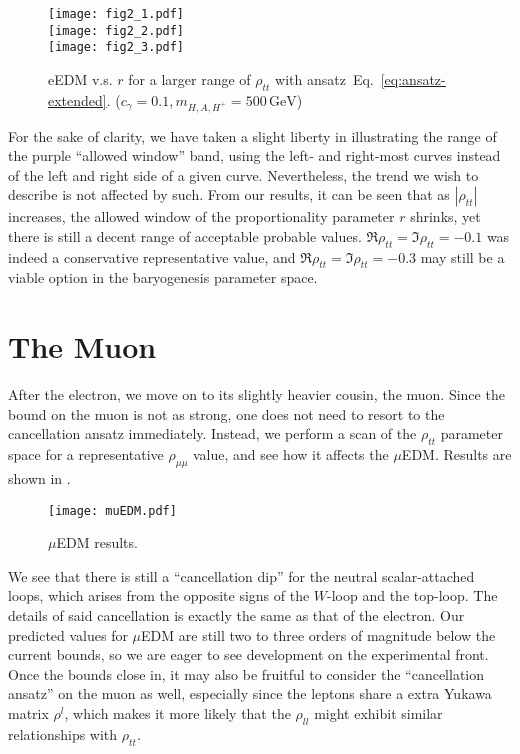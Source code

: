 \begin{figure}[p]
    \centering
    \texttt{[image: fig2\_1.pdf]}\\
    \texttt{[image: fig2\_2.pdf]}\\
    \texttt{[image: fig2\_3.pdf]}
    \caption{eEDM v.s. \(r \) for a larger range of \(\rho_{tt} \) with ansatz~Eq.~\eqref{eq:ansatz-extended}. (\(c_{\gamma} = 0.1, m_{H, A, H^+} = 500\,\mathrm{GeV} \))}
    \label{fig:eEDM}
\end{figure}

For the sake of clarity, we have taken a slight liberty in illustrating the range of the purple ``allowed window'' band,
using the left- and right-most curves instead of the left and right side of a given curve.
Nevertheless, the trend we wish to describe is not affected by such.
From our results, it can be seen that as \(|\rho_{tt}| \) increases, the allowed window of the proportionality parameter \(r \) shrinks, yet there is still a decent range of acceptable probable values.
\(\Re\rho_{tt} = \Im\rho_{tt} = -0.1 \) was indeed a conservative representative value, and \(\Re\rho_{tt} = \Im\rho_{tt} = -0.3 \) may still be a viable option in the baryogenesis parameter space.

\section{The Muon}
After the electron, we move on to its slightly heavier cousin, the muon. 
Since the bound on the muon is not as strong, one does not need to resort to the cancellation ansatz immediately.
Instead, we perform a scan of the \(\rho_{tt} \) parameter space for a representative \(\rho_{\mu\mu} \) value, and see how it affects the \(\mu \)EDM.
Results are shown in .

\begin{figure}[p]
    \centering
    \texttt{[image: muEDM.pdf]}
    \caption{\(\mu \)EDM results.}
    \label{fig:muEDM}
\end{figure}

We see that there is still a ``cancellation dip'' for the neutral scalar-attached loops, which arises from the opposite signs of the \(W \)-loop and the top-loop.
The details of said cancellation is exactly the same as that of the electron.
Our predicted values for \(\mu \)EDM are still two to three orders of magnitude below the current bounds, so we are eager to see development on the experimental front.
Once the bounds close in, it may also be fruitful to consider the ``cancellation ansatz'' on the muon as well, especially since the leptons share a extra Yukawa matrix \(\rho^{l} \),
which makes it more likely that the \(\rho_{ll} \) might exhibit similar relationships with \(\rho_{tt} \).

